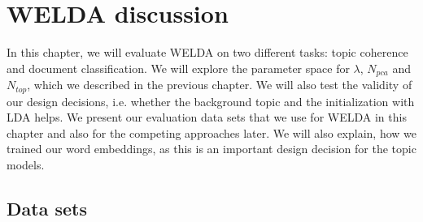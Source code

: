 \documentclass[
        a4paper,
        titlepage,
        twoside,
        parskip,
        numbers=noenddot
        ]{scrbook}
\theoremstyle{break}
\begin{document}
\chapter{WELDA discussion}
\label{sec:welda_discussion}

In this chapter, we will evaluate WELDA on two different tasks: topic coherence and document classification.
We will explore the parameter space for $\lambda$, $N_{pca}$ and $N_{top}$, which we described in the previous chapter.
We will also test the validity of our design decisions, i.e. whether the background topic and the initialization with LDA helps.
We present our evaluation data sets that we use for WELDA in this chapter and also for the competing approaches later.
We will also explain, how we trained our word embeddings, as this is an important design decision for the topic models.

\section{Data sets}
\label{sec:data_sets}
\end{document}
